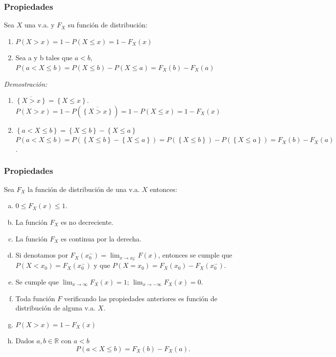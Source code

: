 \documentclass[handout]{beamer}\usepackage[]{graphicx}\usepackage[]{color}
\newcommand{\RR}{\mathbb{R}}
\renewcommand{\leq}{\leqslant}
\theoremstyle{plain}
\newtheorem{prop}{Propiedades}
\theoremstyle{definition}
\begin{document}
\begin{frame}
\frametitle{Propiedades}

Sea $X$ una v.a. y $F_{X}$ su función
de distribución:
\begin{enumerate}[1)]
    \item $P(X>x)=1-P(X\leq x)=1-F_{X}(x)$
    \item Sea a y b tales que $a<b$, $P(a<X\leq b)=P(X\leq b)-P(X\leq a)=F_{X}(b)-F_{X}(a)$
\end{enumerate}
\end{frame}
\begin{frame}
\textit{Demostración:}
\begin{enumerate}[1)]
    \item $\overline{\left\{X>x\right\}}=\left\{X\leq x\right\}$.
    $P(X>x)=1-P(\overline{\left\{X>x\right\}})=1-P(X\leq x)=1-F_{X}(x)$
    \item $\left\{a< X \leq b\right\}= \left\{X\leq b\right\}-\left\{X\leq
    a\right\}$
    $P(a<X\leq b)=P(\left\{X\leq b\right\}-\left\{X\leq
    a\right\})=P(\left\{X\leq b\right\})-P(\left\{X\leq
   a\right\})=F_{X}(b) -F_{X}(a)$.
\end{enumerate}
\end{frame}

\begin{frame}[fragile]
\frametitle{Propiedades}
       Sea $F_{X}$ la función de distribución  de una  v.a. $X$ entonces:
\begin{enumerate}[a)]
\item  $0\leq F_{X}(x)\leq 1$.
\item La función $F_{X}$ es no decreciente.
\item La función $F_{X}$ es continua por la derecha.
\item Si denotamos por $F_X(x_0^{-})=\displaystyle \lim_{x\to x_0^{-}} F(x)$,
entonces se cumple que $P(X< x_0)=F_X(x_0^{-})$ y que $P(X=x_0)=F_X(x_0)-F_X(x_0^{-})$.
\item Se cumple que $\displaystyle \lim_{x\to\infty} F_{X}(x)=1$; $\displaystyle \lim_{x\to-\infty}F_{X}(x)=0$.
\item  Toda función $F$ verificando las propiedades anteriores es función de distribución de alguna v.a. $X$.
\item $P(X>x)=1-F_{X}(x)$
\item Dados $a,b\in \RR$ con $a<b$ $$P(a<X\leq b)=F_{X}(b)-F_{X}(a).$$
\end{enumerate}
\end{frame}
\end{document}
